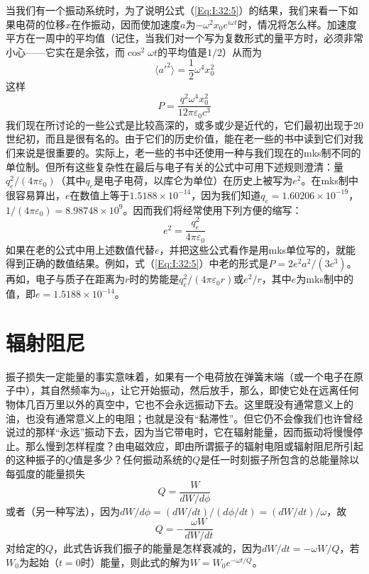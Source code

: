 当我们有一个振动系统时，为了说明公式（\ref{Eq:I:32:5}）的结果，我们来看一下如果电荷的位移$x$在作振动，因而使加速度$a$为$-\omega^2x_0e^{i\omega t}$时，情况将怎么样。加速度平方在一周中的平均值（记住，当我们对一个写为复数形式的量平方时，必须非常小心——它实在是余弦，而$\cos^2\omega t$的平均值是$1/2$）从而为
\begin{equation*}
    \langle a'^2 \rangle = \frac{1}{2}\omega^4x_0^2
\end{equation*}
这样
\begin{equation}
    \label{Eq:I:32:6}
    P = \frac{q^2\omega^4x_0^2}{12\pi\varepsilon_0c^3}
\end{equation}
我们现在所讨论的一些公式是比较高深的，或多或少是近代的，它们最初出现于20世纪初，而且是很有名的。由于它们的历史价值，能在老一些的书中读到它们对我们来说是很重要的。实际上，老一些的书中还使用一种与我们现在的mks制不同的单位制。但所有这些复杂性在最后与电子有关的公式中可用下述规则澄清：量$q_e^2/(4\pi\varepsilon_0)$（其中$q_e$是电子电荷，以库仑为单位）在历史上被写为$e^2$。在mks制中很容易算出，$e$在数值上等于$1.5188\times 10^{-14}$，因为我们知道$q_e=1.60206\times 10^{-19}$，$1/(4\pi\varepsilon_0)=8.98748\times 10^9$。因而我们将经常使用下列方便的缩写：
\begin{equation}
    \label{Eq:I:32:7}
    e^2=\frac{q_e^2}{4\pi\varepsilon_0}
\end{equation}
如果在老的公式中用上述数值代替$e$，并把这些公式看作是用mks单位写的，就能得到正确的数值结果。例如，式（\ref{Eq:I:32:5}）中老的形式是$P=2e^2a^2/(3c^3)$。再如，电子与质子在距离为$r$时的势能是$q_e^2/(4\pi\varepsilon_0r)$或$e^2/r$，其中$e$为mks制中的值，即$e=1.5188\times 10^{-14}$。

\section{辐射阻尼}

振子损失一定能量的事实意味着，如果有一个电荷放在弹簧末端（或一个电子在原子中），其自然频率为$\omega_0$，让它开始振动，然后放手，那么，即使它处在远离任何物体几百万里以外的真空中，它也不会永远振动下去。这里既没有通常意义上的油，也没有通常意义上的电阻；也就是没有“黏滞性”。但它仍不会像我们也许曾经说过的那样“永远”振动下去，因为当它带电时，它在辐射能量，因而振动将慢慢停止。那么慢到怎样程度？由电磁效应，即由所谓振子的辐射电阻或辐射阻尼所引起的这种振子的$Q$值是多少？任何振动系统的$Q$是任一时刻振子所包含的总能量除以每弧度的能量损失
\begin{equation*}
    Q=\frac{W}{dW/d\phi}
\end{equation*}
或者（另一种写法），因为$dW/d\phi = (dW/dt)/(d\phi/dt) = (dW/dt)/\omega$，故
\begin{equation}
    \label{Eq:I:32:8}
    Q=-\frac{\omega W}{dW / dt}
\end{equation}
对给定的$Q$，此式告诉我们振子的能量是怎样衰减的，因为$dW/dt=-\omega W/Q$，若$W_0$为起始（$t=0$时）能量，则此式的解为$W=W_0e^{-\omega t/Q}$。

